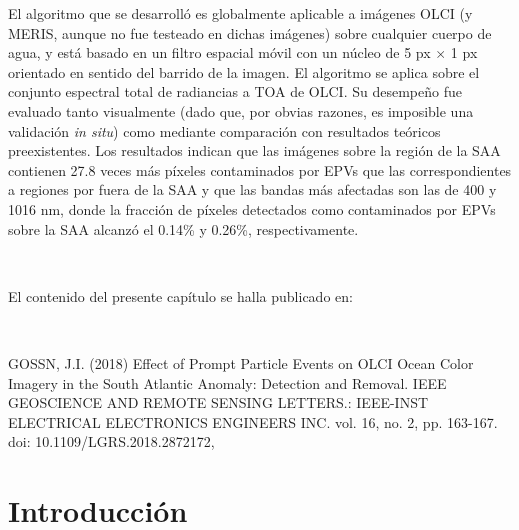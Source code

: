 El algoritmo que se desarrolló es globalmente aplicable a imágenes OLCI (y MERIS, aunque no fue testeado en dichas imágenes) sobre cualquier cuerpo de agua, y está basado en un filtro espacial móvil con un núcleo de 5 px $\times$ 1 px orientado en sentido del barrido de la imagen. El algoritmo se aplica sobre el conjunto espectral total de radiancias a TOA de OLCI. Su desempeño fue evaluado tanto visualmente (dado que, por obvias razones, es imposible una validación \textit{in situ}) como mediante comparación con resultados teóricos preexistentes. Los resultados indican que las imágenes sobre la región de la SAA contienen 27.8 veces más píxeles contaminados por EPVs que las correspondientes a regiones por fuera de la SAA y que las bandas más afectadas son las de 400 y 1016 nm, donde la fracción de píxeles detectados como contaminados por EPVs sobre la SAA alcanzó el 0.14\% y 0.26\%, respectivamente.

$\quad$

\noindent
El contenido del presente capítulo se halla publicado en:

$\quad$

\noindent
GOSSN, J.I. (2018) Effect of Prompt Particle Events on OLCI Ocean Color Imagery in the South Atlantic Anomaly: Detection and Removal. IEEE GEOSCIENCE AND REMOTE SENSING LETTERS.: IEEE-INST ELECTRICAL ELECTRONICS ENGINEERS INC. vol. 16, no. 2, pp. 163-167. doi: 10.1109/LGRS.2018.2872172, \cite{gossn2018}

\section{Introducción}
\label{ppe:s:introduction}


